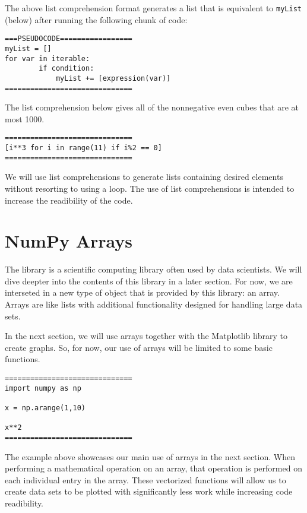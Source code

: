 \documentclass{ximera}
\begin{document}
The above list comprehension format generates a list that is equivalent to \verb|myList| (below) after running the following chunk of code:

\begin{verbatim}
===PSEUDOCODE=================
myList = []
for var in iterable:
        if condition:
        	myList += [expression(var)]
==============================
\end{verbatim}

The list comprehension below gives all of the nonnegative even cubes that are at most 1000.

\begin{verbatim}
==============================
[i**3 for i in range(11) if i%2 == 0]
==============================
\end{verbatim}

We will use list comprehensions to generate lists containing desired elements without resorting to using a loop. The use of list comprehensions is intended to increase the readibility of the code.

\section{NumPy Arrays}

The  library is a scientific computing library often used by data scientists. We will dive deepter into the contents of this library in a later section. For now, we are interseted in a new type of object that is provided by this library: an array. Arrays are like lists with additional functionality designed for handling large data sets. 

In the next section, we will use arrays together with the Matplotlib library to create graphs. So, for now, our use of arrays will be limited to some basic functions.

\begin{verbatim}
==============================
import numpy as np

x = np.arange(1,10)

x**2
==============================
\end{verbatim}

The example above showcases our main use of arrays in the next section. When performing a mathematical operation on an array, that operation is performed on each individual entry in the array. These vectorized functions will allow us to create data sets to be plotted with significantly less work while increasing code readibility.
\end{document}
